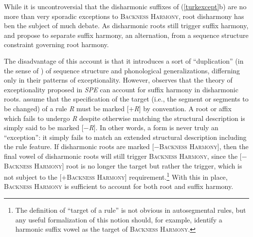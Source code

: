 While it is uncontroversial that the disharmonic suffixes of (\ref{turkexcept}b) are no more than very sporadic exceptions to \textsc{Backness Harmony}, root disharmony has ben the subject of much debate. As disharmonic roots still trigger suffix harmony, \citet[][212, 289]{Anderson1974} and \citet{Iverson1978} propose to separate suffix harmony, an alternation, from a sequence structure constraint governing root harmony.

The disadvantage of this account is that it introduces a sort of ``duplication'' (in the sense of \citealt{Kenstowicz1977}) of sequence structure and phonological generalizations, differning only in their patterns of exceptionality.
However, \citet[][197f.]{Zonneveld1978} observes that the theory of exceptionality proposed in \emph{SPE}
can account for suffix harmony in disharmonic roots. \citeauthor{SPE} assume that the specification of the target (i.e., the segment or segments to be changed) of a rule \emph{R} must be marked [$+$\emph{R}] by convention. A root or affix which fails to undergo \emph{R} despite otherwise matching the structural description is simply said to be marked [$-$\emph{R}]. In other words, a form is never truly an ``exception'': it simply fails to match an extended structural description including the rule feature. If disharmonic roots are marked [$-$\textsc{Backness Harmony}], then the final vowel of disharmonic roots will still trigger \textsc{Backness Harmony}, since the [$-$\textsc{Backness Harmony}] root is no longer the target but rather the trigger, which is not subject to the [$+$\textsc{Backness Harmony}] requirement.\footnote{The definition of ``target of a rule'' is not obvious in autosegmental rules, but any useful formalization of this notion should, for example, identify a harmonic suffix vowel as the target of \textsc{Backness Harmony}.} With this in place, \textsc{Backness Harmony} is sufficient to account for both root and suffix harmony.


